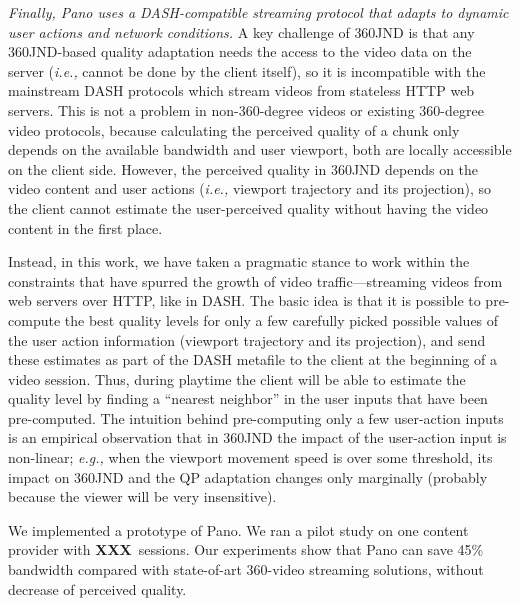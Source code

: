\documentclass[sigconf]{acmart}
\newcommand{\jc}[1]{{\color{blue}{[JC: #1]}}}
\newcommand{\fillme}{{\bf XXX}~}
\newcommand{\name}{{Pano}\xspace}
\newcommand{\vrjnd}{{360JND}\xspace}
\newcommand{\eg}{{\it e.g.,}\xspace}
\newcommand{\ie}{{\it i.e.,}\xspace}
\begin{document}
\vspace{0.2cm}
{\em Finally, \name uses a DASH-compatible streaming protocol that adapts to dynamic user actions and network conditions.}
A key challenge of \vrjnd is that any \vrjnd-based quality adaptation needs the access to the video data on the server (\ie cannot be done by the client itself), so it is incompatible with the mainstream DASH protocols which stream videos from stateless HTTP web servers. 
This is not a problem in non-360-degree videos or existing 360-degree video protocols, because calculating the perceived quality of a chunk only depends on the available bandwidth and user viewport, both are locally accessible on the client side.
However, the perceived quality in \vrjnd depends on the video content and user actions (\ie viewport trajectory and its projection), so the client cannot estimate the user-perceived quality without having the video content in the first place. 

Instead, in this work, we have taken a pragmatic stance to work within the constraints that have spurred the growth of video traffic---streaming videos from web servers over HTTP, like in DASH.
The basic idea is that it is possible to pre-compute the best quality levels for only a few carefully picked possible values of the user action information (viewport trajectory and its projection), and send these estimates as part of the DASH metafile to the client at the beginning of a video session. 
Thus, during playtime the client will be able to estimate the quality level by finding a ``nearest neighbor'' in the user inputs that have been pre-computed. 
The intuition behind pre-computing only a few user-action inputs is an empirical observation that in \vrjnd the impact of the user-action input is non-linear; \eg when the viewport movement speed is over some threshold, its impact on \vrjnd and the QP adaptation changes only marginally (probably because the viewer will be very insensitive).


\vspace{0.2cm}
We implemented a prototype of \name.
\jc{on what platform}
We ran a pilot study on one content provider with \fillme sessions. \jc{how many viewers? what types of videos?}
Our experiments show that \name can save 45\% bandwidth compared with state-of-art 360-video streaming solutions, without decrease of perceived quality.
\jc{add a line to describe the final user-rating based end-to-end experiments}





\end{document}
